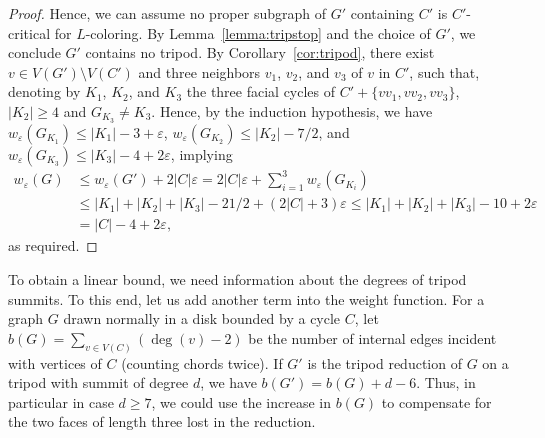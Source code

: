 \documentclass[12pt,twoside,openright,a4paper]{book}
\begin{document}
\begin{proof}
Hence, we can assume no proper subgraph of $G'$ containing $C'$ is $C'$-critical for $L$-coloring.
By Lemma~\ref{lemma:tripstop} and the choice of $G'$, we conclude $G'$ contains no tripod.
By Corollary~\ref{cor:tripod}, there exist $v\in V(G')\setminus V(C')$ and three neighbors
$v_1$, $v_2$, and $v_3$ of $v$ in $C'$, such that, denoting by $K_1$, $K_2$, and $K_3$ the three
facial cycles of $C'+\{vv_1,vv_2,vv_3\}$, $|K_2|\ge 4$ and $G_{K_3}\neq K_3$.
Hence, by the induction hypothesis, we have $w_\varepsilon(G_{K_1})\le |K_1|-3+\varepsilon$,
$w_\varepsilon(G_{K_2})\le |K_2|-7/2$, and $w_\varepsilon(G_{K_3})\le |K_3|-4+2\varepsilon$,
implying
\begin{align*}
w_\varepsilon(G)&\le w_\varepsilon(G')+2|C|\varepsilon=2|C|\varepsilon+\sum_{i=1}^3 w_\varepsilon(G_{K_i})\\
&\le |K_1|+|K_2|+|K_3|-21/2+(2|C|+3)\varepsilon\le |K_1|+|K_2|+|K_3|-10+2\varepsilon\\
&=|C|-4+2\varepsilon,
\end{align*}
as required.
\end{proof}

To obtain a linear bound, we need information about the degrees of tripod summits.
To this end, let us add another term into the weight function.  For a graph $G$ drawn normally
in a disk bounded by a cycle $C$, let $b(G)=\sum_{v\in V(C)} (\deg(v)-2)$ be the number of
internal edges incident with vertices of $C$ (counting chords twice).  If $G'$ is the tripod
reduction of $G$ on a tripod with summit of degree $d$, we have $b(G')=b(G)+d-6$.  Thus, in
particular in case $d\ge 7$, we could use the increase in $b(G)$ to compensate for the two faces
of length three lost in the reduction.
\end{document}
